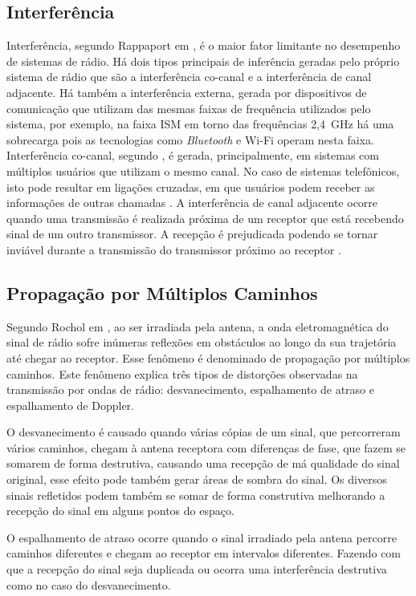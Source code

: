 \subsection{Interferência}
Interferência, segundo Rappaport em \cite{rappaport2009}, é o maior fator limitante no desempenho de sistemas de rádio. Há dois tipos principais de inferência geradas pelo próprio sistema de rádio que são a interferência co-canal e a interferência de canal adjacente. Há também a interferência externa, gerada por dispositivos de comunicação que utilizam das mesmas faixas de frequência utilizados pelo sistema, por exemplo, na faixa ISM em torno das frequências 2,4~GHz há uma sobrecarga pois as tecnologias como \emph{Bluetooth} e Wi-Fi operam nesta faixa. Interferência co-canal, segundo \cite{rochol2018sistemas}, é gerada, principalmente, em sistemas com múltiplos usuários que utilizam o mesmo canal. No caso de sistemas telefônicos, isto pode resultar em ligações cruzadas, em que usuários podem receber as informações de outras chamadas \cite{rappaport2009}. A interferência de canal adjacente ocorre quando uma transmissão é realizada próxima de um receptor que está recebendo sinal de um outro transmissor. A recepção é prejudicada podendo se tornar inviável durante a transmissão do transmissor próximo ao receptor \cite{rappaport2009}.


\subsection{Propagação por Múltiplos Caminhos}
Segundo Rochol em \cite{rochol2018sistemas}, ao ser irradiada pela antena, a onda eletromagnética do sinal de rádio sofre inúmeras reflexões em obstáculos ao longo da sua trajetória até chegar ao receptor. Esse fenômeno é denominado de propagação por múltiplos caminhos. Este fenômeno explica três tipos de distorções observadas na transmissão por ondas de rádio: desvanecimento, espalhamento de atraso e espalhamento de Doppler.

O desvanecimento é causado quando várias cópias de um sinal, que percorreram vários caminhos, chegam à antena receptora com diferenças de fase, que fazem se somarem de forma destrutiva, causando uma recepção de má qualidade do sinal original, esse efeito pode também gerar áreas de sombra do sinal. Os diversos sinais refletidos podem também se somar de forma construtiva melhorando a recepção do sinal em alguns pontos do espaço.

O espalhamento de atraso ocorre quando o sinal irradiado pela antena percorre caminhos diferentes e chegam ao receptor em intervalos diferentes. Fazendo com que a recepção do sinal seja duplicada ou ocorra uma interferência destrutiva como no caso do desvanecimento.

